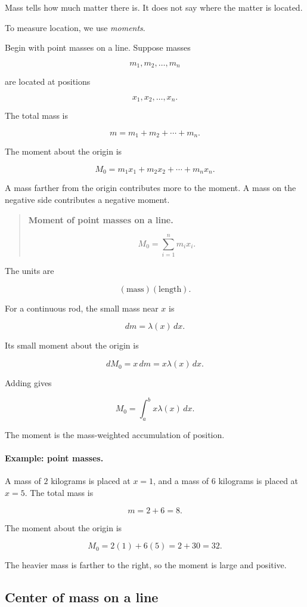 Mass tells how much matter there is.  It does not say where the matter is located.

To measure location, we use \emph{moments}.

Begin with point masses on a line.  Suppose masses

\[
m_1,m_2,\ldots,m_n
\]

are located at positions

\[
x_1,x_2,\ldots,x_n.
\]

The total mass is

\[
m=m_1+m_2+\cdots+m_n.
\]

The moment about the origin is

\[
M_0=m_1x_1+m_2x_2+\cdots+m_nx_n.
\]

A mass farther from the origin contributes more to the moment.  A mass on the
negative side contributes a negative moment.

\begin{quote}
\textbf{Moment of point masses on a line.}

\[
\boxed{
M_0=\sum_{i=1}^n m_i x_i.
}
\]
\end{quote}

The units are

\[
(\text{mass})(\text{length}).
\]

For a continuous rod, the small mass near \(x\) is

\[
dm=\lambda(x)\,dx.
\]

Its small moment about the origin is

\[
dM_0=x\,dm=x\lambda(x)\,dx.
\]

Adding gives

\[
\boxed{
M_0=\int_a^b x\lambda(x)\,dx.
}
\]

The moment is the mass-weighted accumulation of position.

\paragraph{Example: point masses.}
A mass of \(2\) kilograms is placed at \(x=1\), and a mass of \(6\) kilograms is placed
at \(x=5\).  The total mass is

\[
m=2+6=8.
\]

The moment about the origin is

\[
M_0=2(1)+6(5)=2+30=32.
\]

The heavier mass is farther to the right, so the moment is large and positive.

\subsection{Center of mass on a line}
\label{subsec:center-of-mass-line}


